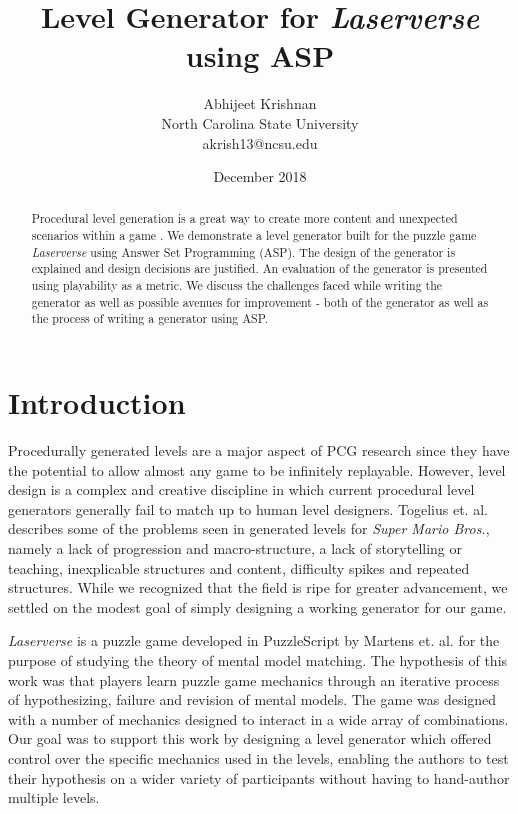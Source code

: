 \documentclass[letterpaper]{article}
\title{Level Generator for \textit{Laserverse} using ASP}
\author{Abhijeet Krishnan \\ North Carolina State University \\ akrish13@ncsu.edu}
\date{December 2018}
\begin{document}
\maketitle

\begin{abstract}
    Procedural level generation is a great way to create more content and unexpected scenarios within a game
    \cite{gamasutra}. We demonstrate a level generator built for the puzzle game \textit{Laserverse} using Answer Set
    Programming (ASP). The design of the generator is explained and design decisions are justified. An evaluation of the
    generator is presented using playability as a metric. We discuss the challenges faced while writing the generator as
    well as possible avenues for improvement - both of the generator as well as the process of writing a generator using
    ASP.
\end{abstract}

\section{Introduction}
Procedurally generated levels are a major aspect of PCG research since they have the potential to allow almost any game
to be infinitely replayable. However, level design is a complex and creative discipline in which current procedural
level generators generally fail to match up to human level designers. Togelius et. al. \cite{togelius2013procedural}
describes some of the problems seen in generated levels for \textit{Super Mario Bros.}, namely a lack of progression and
macro-structure, a lack of storytelling or teaching, inexplicable structures and content, difficulty spikes and repeated
structures. While we recognized that the field is ripe for greater advancement, we settled on the modest goal of simply
designing a working generator for our game.

\textit{Laserverse} is a puzzle game developed in PuzzleScript by Martens et. al. \cite{laserverse} for the purpose of
studying the theory of mental model matching. The hypothesis of this work was that players learn puzzle game mechanics
through an iterative process of hypothesizing, failure and revision of mental models. The game was designed with a
number of mechanics designed to interact in a wide array of combinations. Our goal was to support this work by designing
a level generator which offered control over the specific mechanics used in the levels, enabling the authors to test
their hypothesis on a wider variety of participants without having to hand-author multiple levels.
\end{document}
